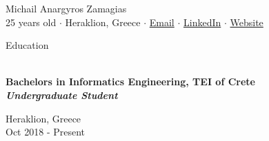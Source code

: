 \documentclass[a4paper, 11pt]{article}
\newcommand{\lineunder} {
    \vspace*{-8pt} \\
    \hspace*{-18pt} \hrulefill \\
}
\newcommand{\header} [1] {
    \vspace*{6mm}
    {\hspace*{-18pt}\vspace*{6pt} #1}
    \vspace*{-6pt} \lineunder
}
\newcommand{\education}[4]{ %
    \vspace*{6pt} %
    \begin{minipage}[t]{0.75\textwidth}
        {\Large \textbf{#1}} \\ %
        \vspace*{2pt}
        {\textbf{\textit{#2}}} \\ %
    \end{minipage} \hfill
    \begin{minipage}[t]{0.2\textwidth}
        #3 \\ %
        #4 \\ 
    \end{minipage}
    \vspace*{6pt} %
}
\newcommand{\socialmediabutton}[2]{%
    \href{#1}{#2}
}
\begin{document}
\vspace*{-30pt}

\begin{center}
    {\Huge {Michail Anargyros Zamagias}} \\\vspace*{2mm}
    25 years old $\cdot$
    Heraklion, Greece $\cdot$
    \socialmediabutton{mailto:contact@mikezamayias.com}{Email}$\cdot$
    \socialmediabutton{https://linkedin.com/in/mikezamayias}{LinkedIn}$\cdot$
    \socialmediabutton{https://mikezamayias.com}{Website}
\end{center}

\header{Education}
\education
{Bachelors in Informatics Engineering, TEI of Crete}
{Undergraduate Student}
{Heraklion, Greece}
{Oct 2018 - Present}
\end{document}
